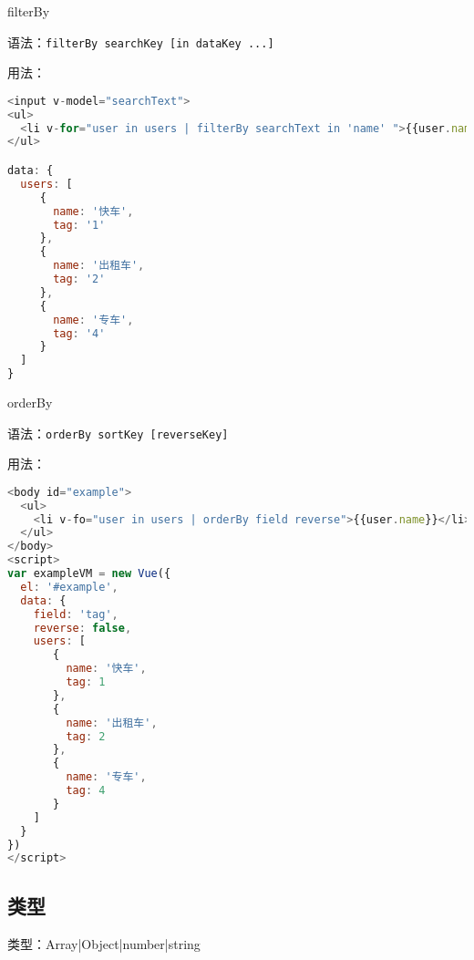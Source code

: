 \begin{compactenum}
\item filterBy

\begin{compactitem}
\item 语法：\texttt{filterBy searchKey [in dataKey ...]}
\item 用法：

\begin{lstlisting}[language=JavaScript]
<input v-model="searchText">
<ul>
  <li v-for="user in users | filterBy searchText in 'name' ">{{user.name}}</li>
</ul>

data: {
  users: [
     {
       name: '快车',
       tag: '1'
     },
     {
       name: '出租车',
       tag: '2'
     },
     {
       name: '专车',
       tag: '4'
     }
  ]
}
\end{lstlisting}

\end{compactitem}

\item orderBy


\begin{compactitem}
\item 语法：\texttt{orderBy sortKey [reverseKey]}
\item 用法：

\begin{lstlisting}[language=JavaScript]
<body id="example">
  <ul>
    <li v-fo="user in users | orderBy field reverse">{{user.name}}</li>
  </ul>
</body>
<script>
var exampleVM = new Vue({
  el: '#example',
  data: {
    field: 'tag',
    reverse: false,
    users: [
       {
         name: '快车',
         tag: 1
       },
       {
         name: '出租车',
         tag: 2
       },
       {
         name: '专车',
         tag: 4
       }
    ]
  }
})
</script>
\end{lstlisting}

\end{compactitem}

\end{compactenum}


\subsection{类型}

\begin{compactitem}
\item 类型：Array|Object|number|string
\end{compactitem}

